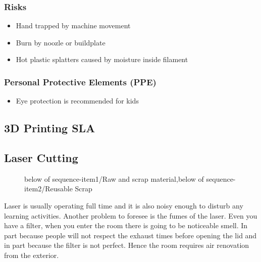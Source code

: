 \documentclass[a4paper,12pt,titlepage]{article}
\begin{document}
\subsubsection*{Risks}
\begin{itemize}
\item Hand trapped by machine movement
\item Burn by noozle or buildplate
\item Hot plastic splatters caused by moisture inside filament
\end{itemize}
\subsubsection*{Personal Protective Elements (PPE)}
\begin{itemize}
\item Eye protection is recommended for kids
\end{itemize}
\clearpage

\subsection{3D Printing SLA}


\subsection{Laser Cutting}
\begin{figure}[h]

\centering
{}
{below of sequence-item1/{Raw and scrap material},below of sequence-item2/Reusable Scrap}
\vspace{1cm}
\end{figure}
\vspace{0.3cm}
Laser is usually operating full time and it is also noisy enough to disturb any learning activities. Another problem to foresee is the fumes of the laser. Even you have a filter, when you enter the room there is going to be noticeable smell. In part because people will not respect the exhaust times before opening the lid and in part because the filter is not perfect. Hence the room requires air renovation from the exterior.
\end{document}
